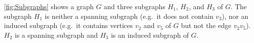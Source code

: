 \begin{Example}\label{ex:Subgraphs}
\cref{fig:Subgraphs} shows a graph $G$ and three subgraphs $H_1$, $H_2$, and $H_3$ of $G$. The subgraph $H_1$ is neither a spanning subgraph (e.g.\ it does not contain $v_3$), nor an induced subgraph (e.g.\ it contains vertices $v_2$ and $v_5$ of $G$ but not the edge $v_2 v_5$). $H_2$ is a spanning subgraph and $H_3$ is an induced subgraph of $G$.
\begin{figure}[!htbp]
\centering
{} \hfill

\end{figure}
\end{Example}
